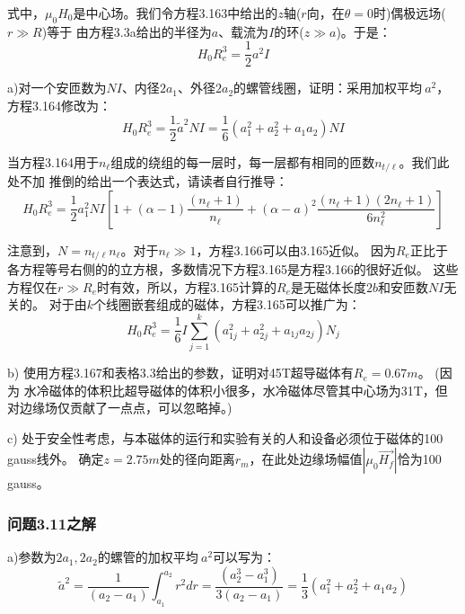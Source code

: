 式中，$\mu_0 H_0$是中心场。我们令方程3.163中给出的$z$轴($r$向，在$\theta=0$时)偶极远场($r\gg R$)等于
由方程3.3a给出的半径为$a$、载流为$I$的环($z\gg a$)。于是：
\begin{equation}
H_{0}R_{e}^{3}=\frac{1}{2}a^{2}I
\end{equation}

a)对一个安匝数为$NI$、内径$2a_1$、外径$2a_2$的螺管线圈，证明：采用加权平均$~{a}^2$，方程3.164修改为：
\begin{equation}
H_{0}R_{e}^{3}=\frac{1}{2}\tilde{a}^{2}NI=\frac{1}{6}(a_{1}^{2}+a_{2}^{2}+a_{1}a_{2})NI
\end{equation}

当方程3.164用于$n_{\ell}$组成的绕组的每一层时，每一层都有相同的匝数$n_{t/\ell}$。我们此处不加
推倒的给出一个表达式，请读者自行推导：
\begin{equation}
H_{0}R_{e}^{3}=\frac{1}{2}a_{1}^{2}NI[1+(\alpha-1)\frac{(n_{\ell}+1)}{n_{\ell}}+(\alpha-a)^{2}\frac{(n_{\ell}+1)(2n_{\ell}+1)}{6n_{\ell}^{2}}]
\end{equation}

注意到，$N=n_{t/\ell} n_{\ell}$。对于$n_{\ell}\gg1$，方程3.166可以由3.165近似。
因为$R_e$正比于各方程等号右侧的的立方根，多数情况下方程3.165是方程3.166的很好近似。
这些方程仅在$r\gg R_e$时有效，所以，方程3.165计算的$R_e$是无磁体长度$2b$和安匝数$NI$无关的。
对于由$k$个线圈嵌套组成的磁体，方程3.165可以推广为：
\begin{equation}
H_{0}R_{e}^{3}=\frac{1}{6}I\sum_{j=1}^{k}(a_{1j}^{2}+a_{2j}^{2}+a_{1j}a_{2j})N_{j}
\end{equation}

b) 使用方程3.167和表格3.3给出的参数，证明对45T超导磁体有$R_e=0.67 m $。 (因为
水冷磁体的体积比超导磁体的体积小很多，水冷磁体尽管其中心场为31T，但对边缘场仅贡献了一点点，可以忽略掉。)

c) 处于安全性考虑，与本磁体的运行和实验有关的人和设备必须位于磁体的100 gauss线外。
确定$z=2.75m$处的径向距离$r_m$，在此处边缘场幅值$|\mu_0 \vec{H_f}|$恰为100 gauss。

\subsubsection{问题3.11之解}
a)参数为$2a_1,2a_2$的螺管的加权平均$~{a}^2$可以写为：
\begin{equation}
\tilde{a}^{2}=\frac{1}{(a_{2}-a_{1})}\int_{a_{1}}^{a_{2}}r^{2}dr=\frac{(a_{2}^{3}-a_{1}^{3})}{3(a_{2}-a_{1})}=\frac{1}{3}(a_{1}^{2}+a_{2}^{2}+a_{1}a_{2})%
\end{equation}

